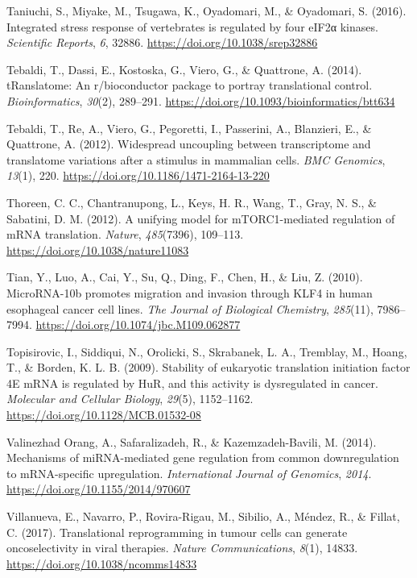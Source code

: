 \documentclass[12pt,openany]{book}
\begin{document}
\hypertarget{ref-Taniuchi2016}{}
Taniuchi, S., Miyake, M., Tsugawa, K., Oyadomari, M., \& Oyadomari, S.
(2016). Integrated stress response of vertebrates is regulated by four
eIF2α kinases. \emph{Scientific Reports}, \emph{6}, 32886.
\url{https://doi.org/10.1038/srep32886}

\hypertarget{ref-Tebaldi2014}{}
Tebaldi, T., Dassi, E., Kostoska, G., Viero, G., \& Quattrone, A.
(2014). tRanslatome: An r/bioconductor package to portray translational
control. \emph{Bioinformatics}, \emph{30}(2), 289--291.
\url{https://doi.org/10.1093/bioinformatics/btt634}

\hypertarget{ref-Tebaldi2012}{}
Tebaldi, T., Re, A., Viero, G., Pegoretti, I., Passerini, A., Blanzieri,
E., \& Quattrone, A. (2012). Widespread uncoupling between transcriptome
and translatome variations after a stimulus in mammalian cells.
\emph{BMC Genomics}, \emph{13}(1), 220.
\url{https://doi.org/10.1186/1471-2164-13-220}

\hypertarget{ref-Thoreen2012}{}
Thoreen, C. C., Chantranupong, L., Keys, H. R., Wang, T., Gray, N. S.,
\& Sabatini, D. M. (2012). A unifying model for mTORC1-mediated
regulation of mRNA translation. \emph{Nature}, \emph{485}(7396),
109--113. \url{https://doi.org/10.1038/nature11083}

\hypertarget{ref-Tian2010}{}
Tian, Y., Luo, A., Cai, Y., Su, Q., Ding, F., Chen, H., \& Liu, Z.
(2010). MicroRNA-10b promotes migration and invasion through KLF4 in
human esophageal cancer cell lines. \emph{The Journal of Biological
Chemistry}, \emph{285}(11), 7986--7994.
\url{https://doi.org/10.1074/jbc.M109.062877}

\hypertarget{ref-Topisirovic2009}{}
Topisirovic, I., Siddiqui, N., Orolicki, S., Skrabanek, L. A., Tremblay,
M., Hoang, T., \& Borden, K. L. B. (2009). Stability of eukaryotic
translation initiation factor 4E mRNA is regulated by HuR, and this
activity is dysregulated in cancer. \emph{Molecular and Cellular
Biology}, \emph{29}(5), 1152--1162.
\url{https://doi.org/10.1128/MCB.01532-08}

\hypertarget{ref-ValinezhadOrang2014}{}
Valinezhad Orang, A., Safaralizadeh, R., \& Kazemzadeh-Bavili, M.
(2014). Mechanisms of miRNA-mediated gene regulation from common
downregulation to mRNA-specific upregulation. \emph{International
Journal of Genomics}, \emph{2014}.
\url{https://doi.org/10.1155/2014/970607}

\hypertarget{ref-Villanueva2017}{}
Villanueva, E., Navarro, P., Rovira-Rigau, M., Sibilio, A., Méndez, R.,
\& Fillat, C. (2017). Translational reprogramming in tumour cells can
generate oncoselectivity in viral therapies. \emph{Nature
Communications}, \emph{8}(1), 14833.
\url{https://doi.org/10.1038/ncomms14833}
\end{document}
